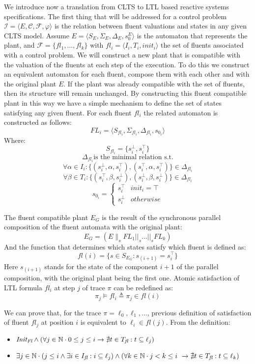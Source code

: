 
We introduce now a translation from CLTS to LTL based reactive systems specifications.
The first thing that will be addressed for a control problem $\mathcal{I} = \langle E, \mathcal{C}, \mathcal{F}, \varphi \rangle$ is the relation between fluent valuations and states in any given CLTS model. Assume $E = \langle S_E, \Sigma_E, \Delta_E, s^E_0 \rangle$ is the automaton that represents the plant, and $\mathcal{F}=\{fl_1,\ldots,fl_k\}$ with $fl_i = \langle I_i, T_i, init_i \rangle$ the set of fluents associated with a control problem. We will construct a new plant that is compatible with the valuation of the fluents at each step of the execution. To do this we construct an equivalent automaton for each fluent, compose them with each other and with the original plant $E$. If the plant was already compatible with the set of fluents, then its structure will remain unchanged. By constructing this fluent compatible plant in this way we have a simple mechanism to define the set of states satisfying any given fluent.  For each fluent $fl_i$ the related automaton is constructed as follows:
\[ FL_i = \langle S_{fl_i}, \Sigma_{fl_i}, \Delta_{fl_i}, s_{0_i}\rangle \]
Where:
\[S_{fl_i}= \{s^{\bot}_i, s^{\top}_i\} \]
\[\Delta_{fl_i} \text{is the minimal relation s.t.}\]
\[ \forall \alpha \in I_i: \{(s^{\bot}_i,\alpha,s^{\top}_i), (s^{\top}_i,\alpha,s^{\top}_i)\} \in \Delta_{fl_i} \]
\[ \forall \beta \in T_i: \{(s^{\top}_i,\beta,s^{\bot}_i), (s^{\bot}_i,\beta,s^{\bot}_i)\} \in \Delta_{fl_i} \]
\[
s_{0_i} = \begin{cases}
s^{\top}_i & init_i = \top \\
s^{\bot}_i & otherwise
\end{cases}
\]

The fluent compatible plant $E_G$ is the result of the synchronous parallel composition of the fluent automata with the original plant:
\[E_G = (E \parallel_s FL_1 ||_s \ldots ||_s FL_k) \]
And the function that determines which states satisfy which fluent is defined as:
\[ fl(i) = \{s \in S_{E_G} : s_{(i + 1)} = s^{\top}_i \} \]
Here $s_{(i+1)}$ stands for the state of the component $i+1$ of the parallel composition, with the original plant being the first one.
Atomic satisfaction of LTL formula $fl_i$ at step $j$ of trace $\pi$ can be redefined as:
\[ \pi_j \models fl_i \triangleq \pi_j \in fl(i) \]

We can prove that, for the trace $\pi=\ell_0,\ell_1,\ldots$, previous definition of satisfaction of fluent $fl_j$ at position $i$ is equivalent to $\ell_i \in fl(j)$.
From the definition:
\begin{itemize}%
	\item $\emph{Init}_{\emph{Fl}} \wedge (\forall j \in \mathbb{N} \cdot 0 \leq j \leq i \rightarrow \nexists t \in T_{\emph{fl}}: t \subseteq \ell_j)$
	\item $\exists j \in \mathbb{N} \cdot (j \leq i \wedge \exists i \in I_{\emph{fl}}: i \subseteq \ell_j) \wedge (\forall k \in \mathbb{N} \cdot j < k \leq i \ \rightarrow \nexists t \in T_{\emph{fl}}: t \subseteq \ell_k)$
\end{itemize} 

